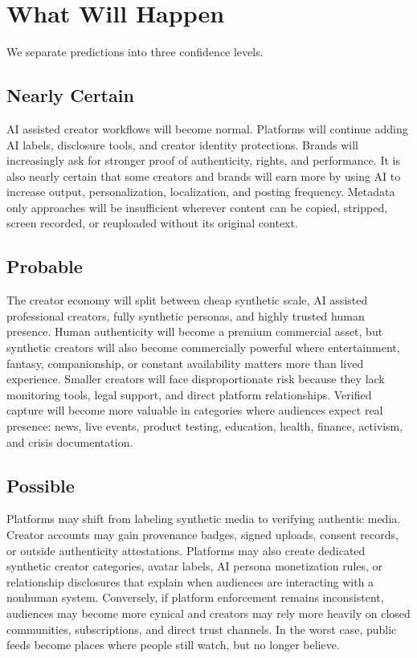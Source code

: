 \documentclass[11pt]{article}
\begin{document}
\section{What Will Happen}

We separate predictions into three confidence levels.

\subsection{Nearly Certain}

AI assisted creator workflows will become normal. Platforms will continue adding AI labels, disclosure tools, and creator identity protections. Brands will increasingly ask for stronger proof of authenticity, rights, and performance. It is also nearly certain that some creators and brands will earn more by using AI to increase output, personalization, localization, and posting frequency. Metadata only approaches will be insufficient wherever content can be copied, stripped, screen recorded, or reuploaded without its original context.

\subsection{Probable}

The creator economy will split between cheap synthetic scale, AI assisted professional creators, fully synthetic personas, and highly trusted human presence. Human authenticity will become a premium commercial asset, but synthetic creators will also become commercially powerful where entertainment, fantasy, companionship, or constant availability matters more than lived experience. Smaller creators will face disproportionate risk because they lack monitoring tools, legal support, and direct platform relationships. Verified capture will become more valuable in categories where audiences expect real presence: news, live events, product testing, education, health, finance, activism, and crisis documentation.

\subsection{Possible}

Platforms may shift from labeling synthetic media to verifying authentic media. Creator accounts may gain provenance badges, signed uploads, consent records, or outside authenticity attestations. Platforms may also create dedicated synthetic creator categories, avatar labels, AI persona monetization rules, or relationship disclosures that explain when audiences are interacting with a nonhuman system. Conversely, if platform enforcement remains inconsistent, audiences may become more cynical and creators may rely more heavily on closed communities, subscriptions, and direct trust channels. In the worst case, public feeds become places where people still watch, but no longer believe.
\end{document}
